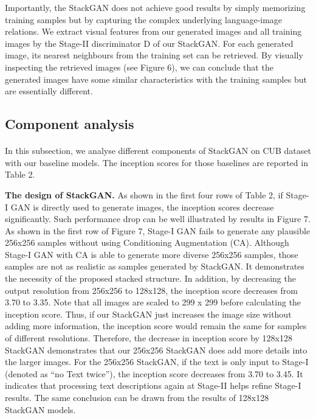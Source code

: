 \documentclass[a4paper,12pt,oneside]{article}
\begin{document}
Importantly, the StackGAN does not achieve good results by simply memorizing training samples but by capturing the complex underlying language-image relations. We extract visual features from our generated images and all training images by the Stage-II discriminator D of our StackGAN. For each generated image, its nearest neighbours from the training set can be retrieved. By visually inspecting the retrieved images (see Figure 6), we can conclude that the generated images have some similar characteristics with the training samples but are essentially different. 

\subsection{Component analysis}
\paragraph{}
In this subsection, we analyse different components of StackGAN on CUB dataset with our baseline models. The inception scores for those baselines are reported in Table 2. 

\textbf{The design of StackGAN. }As shown in the first four rows of Table 2, if Stage-I GAN is directly used to generate images,
the inception scores decrease significantly. Such performance drop can be well illustrated by results in Figure 7. As shown in the first row of Figure 7, Stage-I GAN fails to generate any plausible 
256x256 samples without using Conditioning Augmentation (CA). Although Stage-I GAN with CA is able to generate more diverse 
256x256 samples, those samples are not as realistic as samples generated by StackGAN. It demonstrates the necessity of the proposed stacked structure. 
In addition, by decreasing the output resolution from 256x256 to 128x128, the inception score decreases from 3.70 to 3.35. Note that all images are scaled to 
299 x 299 before calculating the inception score. Thus, if our StackGAN just increases the image size without adding more information, the inception score would remain the same for samples of different resolutions. 
Therefore, the decrease in inception score by 128x128 StackGAN demonstrates that our 256x256 StackGAN does add more details into the larger images. For the 256x256 StackGAN, if the text is only input to Stage-I (denoted as “no 
Text twice”), the inception score decreases from 3.70 to 3.45. It indicates that processing text descriptions again at Stage-II helps refine Stage-I results. The same conclusion can be drawn from the results of 128x128 StackGAN models. 
\end{document}
